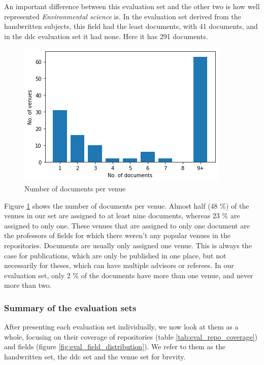 An important difference between this evaluation set and the other two is how well represented \textit{Environmental science} is. In the evaluation set derived from the handwritten subjects, this field had the least documents, with 41 documents, and in the \acrshort{ddc} evaluation set it had none. Here it has 291 documents.

\begin{figure}
    \centering
    \includegraphics[width=.7\textwidth]{figures/evaluation/docs_per_venue.png}
    \caption{Number of documents per venue}
    \label{fig:docs_per_venue}
\end{figure}

Figure \ref{fig:docs_per_venue} shows the number of documents per venue. Almost half (48 \%) of the venues in our set are assigned to at least nine documents, whereas 23 \% are assigned to only one. These venues that are assigned to only one document are the professors of fields for which there weren't any popular venues in the repositories. Documents are usually only assigned one venue. This is always the case for publications, which are only be published in one place, but not necessarily for theses, which can have multiple advisors or referees. In our evaluation set, only 2 \% of the documents have more than one venue, and never more than two.

\subsubsection{Summary of the evaluation sets} \label{eval_datasets_summary}

After presenting each evaluation set individually, we now look at them as a whole, focusing on their coverage of repositories (table \ref{tab:eval_repo_coverage}) and fields (figure \ref{fig:eval_field_distribution}). We refer to them as the handwritten set, the \acrshort{ddc} set and the venue set for brevity.

